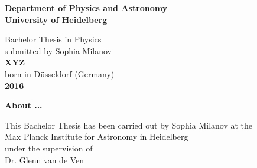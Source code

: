 \begin{titlepage}
\begin{center}
 
\Large\textbf{Department of Physics and Astronomy\\
University of Heidelberg}

\vspace{18cm}

\normalsize
Bachelor Thesis in Physics\\
submitted by Sophia Milanov\\
\vspace{0.5cm}
\Large\textbf{XYZ}\\
\normalsize
\vspace{0.5cm}
born in Düsseldorf (Germany)\\
\vspace{0.5cm}
\Large\textbf{2016}
\normalsize

\newpage




\Large\textbf{About ...}

\vspace{18cm}

\normalsize
This Bachelor Thesis has been carried out by Sophia Milanov at the\\
Max Planck Institute for Astronomy in Heidelberg\\
under the supervision of\\
Dr. Glenn van de Ven

\vfill
\end{center}

\end{titlepage}
